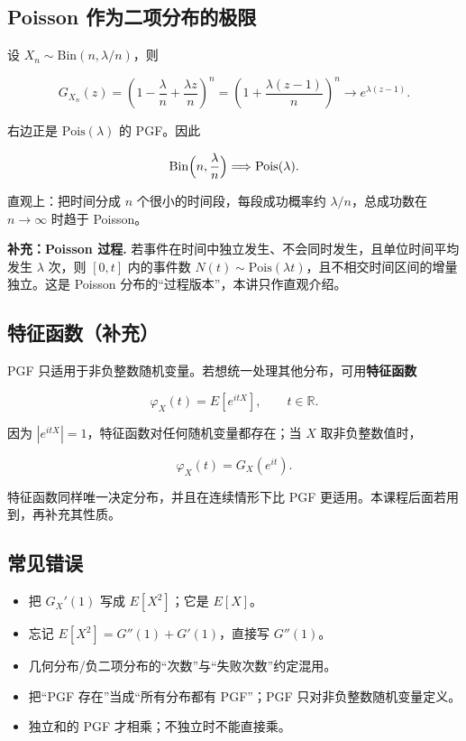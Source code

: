 \subsection{Poisson 作为二项分布的极限}


设 $X_n\sim\mathrm{Bin}(n,\lambda/n)$，则

\[
G_{X_n}(z)=\left(1-\frac{\lambda}{n}+\frac{\lambda z}{n}\right)^n
=\left(1+\frac{\lambda(z-1)}{n}\right)^n
\longrightarrow e^{\lambda(z-1)}.
\]

右边正是 $\mathrm{Pois}(\lambda)$ 的 PGF。因此

\[
\mathrm{Bin}\Bigl(n,\frac{\lambda}{n}\Bigr)
\Longrightarrow \mathrm{Pois}(\lambda).
\]

直观上：把时间分成 $n$ 个很小的时间段，每段成功概率约 $\lambda/n$，总成功数在 $n\to\infty$ 时趋于 Poisson。

\textbf{补充：Poisson 过程.} 若事件在时间中独立发生、不会同时发生，且单位时间平均发生 $\lambda$ 次，则 $[0,t]$ 内的事件数 $N(t)\sim\mathrm{Pois}(\lambda t)$，且不相交时间区间的增量独立。这是 Poisson 分布的“过程版本”，本讲只作直观介绍。

\subsection{特征函数（补充）}


PGF 只适用于非负整数随机变量。若想统一处理其他分布，可用\textbf{特征函数}

\[
\varphi_X(t)=E[e^{itX}],
\qquad t\in\mathbb R.
\]

因为 $|e^{itX}|=1$，特征函数对任何随机变量都存在；当 $X$ 取非负整数值时，

\[
\varphi_X(t)=G_X(e^{it}).
\]

特征函数同样唯一决定分布，并且在连续情形下比 PGF 更适用。本课程后面若用到，再补充其性质。

\subsection{常见错误}


\begin{itemize}
\item 把 $G_X'(1)$ 写成 $E[X^2]$；它是 $E[X]$。
\item 忘记 $E[X^2]=G''(1)+G'(1)$，直接写 $G''(1)$。
\item 几何分布/负二项分布的“次数”与“失败次数”约定混用。
\item 把“PGF 存在”当成“所有分布都有 PGF”；PGF 只对非负整数随机变量定义。
\item 独立和的 PGF 才相乘；不独立时不能直接乘。
\end{itemize}
